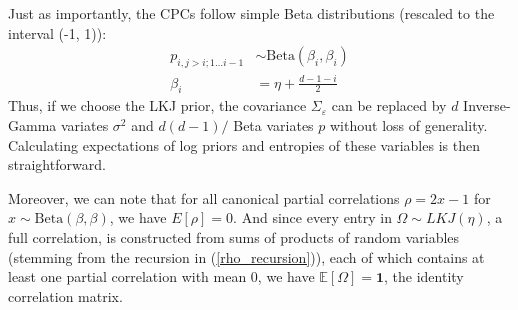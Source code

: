 \documentclass[11pt]{article}
\begin{document}
Just as importantly, the CPCs follow simple Beta distributions (rescaled to the interval (-1, 1)):
\begin{align}
    p_{i,j > i;1\ldots i - 1} &\sim \mathrm{Beta}(\beta_{i}, \beta_{i}) \\
    \beta_i &= \eta + \frac{d - 1 - i}{2}
\end{align}
Thus, if we choose the LKJ prior, the covariance $\Sigma_\varepsilon$ can be replaced by $d$ Inverse-Gamma variates $\sigma^2$ and $d(d-1)/$ Beta variates $p$ without loss of generality. Calculating expectations of log priors and entropies of these variables is then straightforward.

Moreover, we can note that for all canonical partial correlations $\rho = 2x - 1$ for $x \sim \mathrm{Beta}(\beta, \beta)$, we have $E[\rho] = 0$. And since every entry in $\Omega \sim LKJ(\eta)$, a full correlation, is constructed from sums of products of random variables (stemming from the recursion in (\ref{rho_recursion})), each of which contains at least one partial correlation with mean 0, we have $\mathbb{E}[\Omega] = \mathbf{1}$, the identity correlation matrix.
\end{document}
